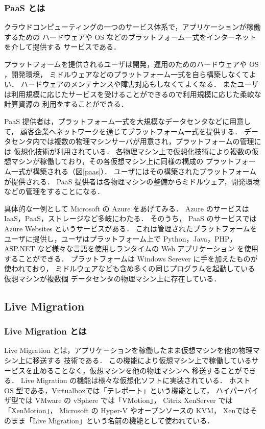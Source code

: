 \documentclass[graduation-thesis]{mlarticle}
\begin{document}
\subsubsection{PaaS とは}
\label{sec-2-2-2}
クラウドコンピューティングの一つのサービス体系で，アプリケーションが稼働するための
ハードウェアや OS などのプラットフォーム一式をインターネットを介して提供する
サービスである．

プラットフォームを提供されるユーザは開発，運用のためのハードウェアや OS ，開発環境，
ミドルウェアなどのプラットフォーム一式を自ら構築しなくてよい．
ハードウェアのメンテナンスや障害対応もしなくてよくなる．
またユーザは利用規模に応じたサービスを受けることができるので利用規模に応じた柔軟な計算資源の
利用をすることができる．

PaaS 提供者は，プラットフォーム一式を大規模なデータセンタなどに用意して，
顧客企業へネットワークを通じてプラットフォーム一式を提供する．
データセンタ内では複数の物理マシンサーバが用意され，プラットフォームの管理には
仮想化技術が利用されている．
各物理マシン上で仮想化技術により複数の仮想マシンが稼働しており，その各仮想マシン上に同様の構成の
プラットフォーム一式が構築される（図\ref{paas}）．
ユーザにはその構築されたプラットフォームが提供される．
PaaS 提供者は各物理マシンの整備からミドルウェア，開発環境などの管理をすることになる．

具体的な一例として Microsoft の Azure\cite{azure} をあげてみる．
Azure のサービスは IaaS，PaaS，ストレージなど多岐にわたる．
そのうち， PaaS のサービスでは Azure Websites というサービスがある．
これは管理されたプラットフォームをユーザに提供し，ユーザはプラットフォーム上で
Python，Java，PHP，ASP.NET など様々な言語を使用しランタイムの Web アプリケーション
を使用することができる．
プラットフォームは Windows Serever に手を加えたものが使われており，
ミドルウェアなども含め多くの同じプログラムを起動している仮想マシンが複数個
データセンタの物理マシン上に存在している．

\subsection{Live Migration}
\label{sec-2-3}
\subsubsection{Live Migration とは}
\label{sec-2-3-1}
Live Migration とは，アプリケーションを稼働したまま仮想マシンを他の物理マシン上に移送する
技術である．
この機能により仮想マシン上で稼働しているサービスを止めることなく，仮想マシンを他の物理マシンへ
移送することができる．
Live Migration の機能は様々な仮想化ソフトに実装されている．
ホスト OS 型である，Virtualbox\cite{virtualbox}では「テレポート」という機能として，
ハイパーバイザ型では VMware の vSphere\cite{vsphere} では「VMotion」，
Citrix XenServer\cite{xenserver} では「XenMotion」，
Microsoft の Hyper-V\cite{hyper-v} やオープンソースの KVM\cite{kvm}，
Xen\cite{xen}ではそのまま「Live Migration」という名前の機能として使われている．
\end{document}
